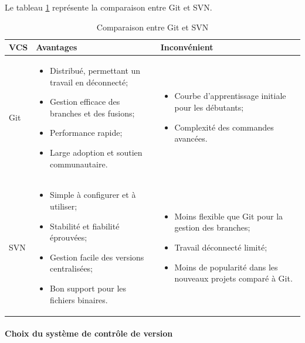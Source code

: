 \documentclass[12pt]{report}
\begin{document}
				Le tableau \ref{tab:VCS} représente la comparaison entre Git et SVN.
				
				\begin{longtable}{|p{1cm}|p{6.5cm}|p{6.5cm}|} 
						\caption{Comparaison entre Git et SVN} 
						\label{tab:VCS}\\ 
						\hline 
						\textbf{VCS}  & \textbf{Avantages} & \textbf{Inconvénient}\\ 
						\hline 
						\endfirsthead 	
						\endhead
						Git &
						\begin{itemize}
							\item Distribué, permettant un travail en déconnecté;
							\item Gestion efficace des branches et des fusions;
							\item Performance rapide;
							\item Large adoption et soutien communautaire.
						\end{itemize}
						&
						\begin{itemize}
							\item Courbe d'apprentissage initiale pour les débutants;
							\item Complexité des commandes avancées.
						\end{itemize}\\
						\hline
						SVN & 
						\begin{itemize}
							\item Simple à configurer et à utiliser;
							\item Stabilité et fiabilité éprouvées;
							\item Gestion facile des versions centralisées;
							\item Bon support pour les fichiers binaires.
						\end{itemize}
						&
						\begin{itemize}
							\item Moins flexible que Git pour la gestion des branches;
							\item Travail déconnecté limité;
							\item Moins de popularité dans les nouveaux projets comparé à Git.
						\end{itemize} \\
						 \hline
				    \end{longtable}


				\paragraph{Choix du système de contrôle de version}
				
\end{document}
